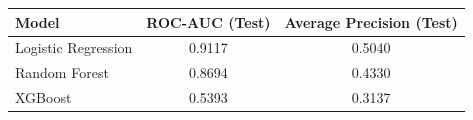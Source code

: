 \begin{tabular}{lcc}
\hline
Model & ROC-AUC (Test) & Average Precision (Test) \\
\hline
Logistic Regression & 0.9117 & 0.5040 \\
Random Forest & 0.8694 & 0.4330 \\
XGBoost & 0.5393 & 0.3137 \\
\hline
\end{tabular}